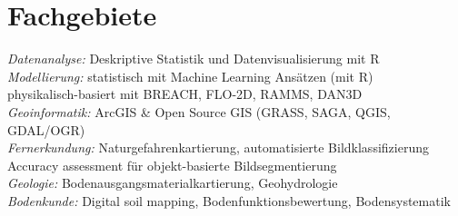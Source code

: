 \documentclass[a4paper]{twentysecondcv} %
\begin{document}

\aboutme{} %







\makeprofile %




\section{Fachgebiete}

\emph{Datenanalyse:} Deskriptive Statistik und Datenvisualisierung mit R\\[0.3em]
\emph{Modellierung:} statistisch mit Machine Learning Ans\"atzen (mit R)\\
\hspace*{6em}           physikalisch-basiert mit BREACH, FLO-2D, RAMMS, DAN3D\\[0.3em]
\emph{Geoinformatik: }ArcGIS \& Open Source GIS (GRASS, SAGA, QGIS, GDAL/OGR)\\[0.3em]
\emph{Fernerkundung:} Naturgefahrenkartierung, automatisierte Bildklassifizierung\\
\hspace*{7em}           Accuracy assessment f\"ur objekt-basierte Bildsegmentierung\\[0.3em]
\emph{Geologie:} Bodenausgangsmaterialkartierung, Geohydrologie\\[0.3em]
\emph{Bodenkunde:}  Digital soil mapping, Bodenfunktionsbewertung, Bodensystematik\\[0.3em]
\end{document}
